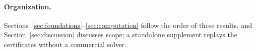 \paragraph{Organization.}
Sections~\ref{sec:foundations}--\ref{sec:computation} follow the order of
these results, and Section~\ref{sec:discussion} discusses scope; a
standalone supplement replays the certificates without a commercial solver.

